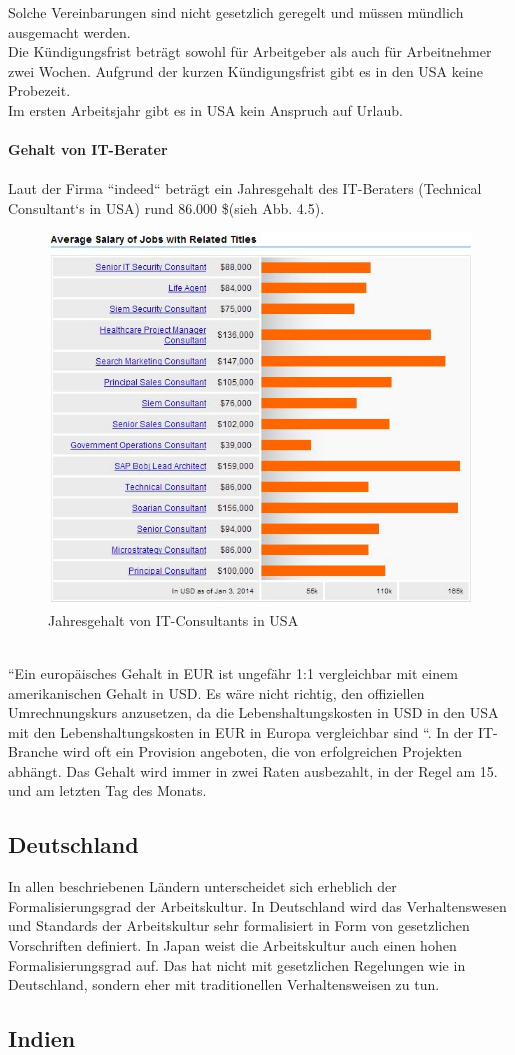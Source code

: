 		Solche Vereinbarungen sind nicht gesetzlich geregelt und müssen mündlich ausgemacht werden.\\
		Die Kündigungsfrist beträgt sowohl für Arbeitgeber als auch für 
		Arbeitnehmer zwei Wochen. Aufgrund der kurzen Kündigungsfrist gibt es in den USA keine Probezeit.\\
		Im ersten Arbeitsjahr gibt es in USA kein Anspruch auf Urlaub.
		\\
		\\
	\textbf{Gehalt von IT-Berater}\\
		\\
		Laut der Firma ``indeed`` beträgt ein Jahresgehalt des IT-Beraters (Technical Consultant`s in USA) rund 86.000 \$(sieh Abb. 4.5).
		\begin{figure}[ht]
				\centering
				\includegraphics[width=0.7\linewidth]{./images/Techn_Cons_Sal}
				\caption{Jahresgehalt von IT-Consultants in USA}
				\label{fig:TechConsSal}
				\end{figure}\\
		``Ein europäisches Gehalt in EUR ist ungefähr 1:1 vergleichbar mit einem 
		amerikanischen Gehalt in USD. Es wäre nicht richtig, den offiziellen Umrechnungskurs anzusetzen, da die Lebenshaltungskosten in USD in den USA mit den Lebenshaltungskosten in EUR in Europa vergleichbar sind	``. In der IT-Branche wird oft ein Provision angeboten, die von erfolgreichen 
		Projekten abhängt. Das Gehalt wird immer in zwei Raten ausbezahlt, in der Regel am 15. und am letzten Tag des Monats. 
		

	\subsection{Deutschland}
	In allen beschriebenen Ländern unterscheidet sich erheblich der Formalisierungsgrad der Arbeitskultur. In Deutschland wird das Verhaltenswesen und Standards der Arbeitskultur sehr formalisiert in Form von gesetzlichen Vorschriften definiert. In Japan weist die Arbeitskultur auch einen hohen Formalisierungsgrad auf. Das hat nicht mit gesetzlichen Regelungen wie in Deutschland, sondern eher mit traditionellen Verhaltensweisen zu tun.
	
	\subsection{Indien}
	